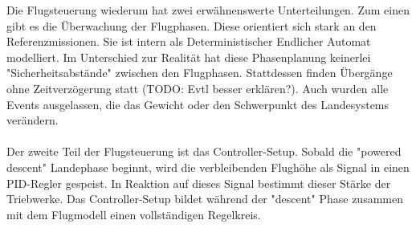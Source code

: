 Die Flugsteuerung wiederum hat zwei erwähnenswerte Unterteilungen. Zum einen gibt es die Überwachung der Flugphasen. Diese orientiert sich stark an den Referenzmissionen. Sie ist intern als Deterministischer Endlicher Automat  modelliert. Im Unterschied zur Realität hat diese Phasenplanung keinerlei "Sicherheitsabstände" zwischen den Flugphasen. Stattdessen finden Übergänge ohne Zeitverzögerung statt (TODO: Evtl besser erklären?). Auch wurden alle Events ausgelassen, die das Gewicht oder den Schwerpunkt des Landesystems verändern.\\ \\

Der zweite Teil der Flugsteuerung ist das Controller-Setup. Sobald die "powered descent" Landephase beginnt, wird die verbleibenden Flughöhe als Signal in einen PID-Regler gespeist. In Reaktion auf dieses Signal bestimmt dieser Stärke der Triebwerke. Das Controller-Setup bildet während der "descent" Phase zusammen mit dem Flugmodell einen vollständigen Regelkreis.
